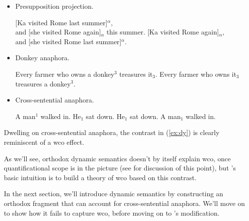\documentclass[nols,twoside,nofonts,nobib,nohyper]{tufte-handout}
\begin{document}
\begin{itemize}

  \item Presupposition projection.

    \pex
    \a{}[Ka visited Rome last summer]$^{α}$,\\
    and [she visited Rome again]$_{α}$
    this summer.
    \a\ljudge{\#}{}[Ka visited Rome again]$_{α}$,\\
    and [she visited Rome last summer]$^{α}$.
    \xe

    \item Donkey anaphora.

    \pex
    \a Every farmer who owns a donkey$^{3}$ treasures it$_{3}$.
    \a{}Every farmer who owns it$_{3}$ treasures a donkey$^{3}$.
    \xe

    \item Cross-sentential anaphora.

    \pex\label{ex:dy}
    \a A man$^{1}$ walked in. He$_{1}$ sat down.\label{ex:dy1}
    \a\ljudge{*}He$_{1}$ sat down. A man$_{1}$ walked in.\label{ex:dy2}
    \xe

 \end{itemize}

    Dwelling on cross-sentential anaphora, the contrast in (\ref{ex:dy}) is
    clearly reminiscent of a \ac{wco} effect.

    As we'll see, orthodox dynamic
    semantics doesn't by itself explain \ac{wco}, once quantificational scope is in the picture (see
    \citealt{charlow2019static} for discussion of this point), but
    \citeauthor{chierchia2020}'s basic intuition is to build a theory of
    \ac{wco} based on this contrast.

    In the next section, we'll introduce dynamic semantics by constructing an
    orthodox fragment that can account for cross-sentential anaphora. We'll move
    on to show how it fails to capture \ac{wco}, before moving on to
    \citeauthor{chierchia2020}'s modification.
\end{document}
